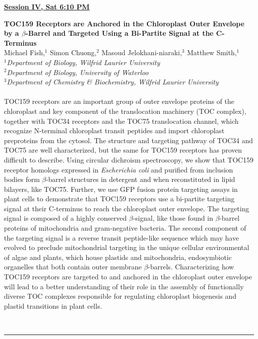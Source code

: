 \documentclass[titlepage,oneside,openany,10pt]{book}
\newenvironment{oralabs}[4] %
        {
        \begin{flushright}
                \underline{\textbf{#4}}
        \end{flushright}
        \textbf{#1}\\%
        #2\\%
        \textit{#3}\\\\%
        }
        {
        \\
        \noindent\rule{15cm}{0.5pt}%
        }
\begin{document}

\newpage

\begin{oralabs}
    {TOC159 Receptors are Anchored in the Chloroplast Outer Envelope by a $\beta$-Barrel and Targeted Using a Bi-Partite Signal at the C-Terminus}
    {Michael Fish,$^{1}$ Simon Chuong,$^{2}$ Masoud Jelokhani-niaraki,$^{3}$ Matthew Smith,$^{1}$}
    {
    $^1$Department of Biology, Wilfrid Laurier University\\
    $^2$Department of Biology, University of Waterloo\\
    $^3$Department of Chemistry \& Biochemistry, Wilfrid Laurier University
    }
    {Session IV, Sat 6:10 PM}
    TOC159 receptors are an important group of outer envelope proteins of the chloroplast and key component of the translocation machinery (TOC complex), together with TOC34 receptors and the TOC75 translocation channel, which recognize N-terminal chloroplast transit peptides and import chloroplast preproteins from the cytosol. The structure and targeting pathway of TOC34 and TOC75 are well characterized, but the same for TOC159 receptors has proven difficult to describe. Using circular dichroism spectroscopy, we show that TOC159 receptor homologs expressed in \emph{Escherichia coli} and purified from inclusion bodies form $\beta$-barrel structures in detergent and when reconstituted in lipid bilayers, like TOC75. Further, we use GFP fusion protein targeting assays in plant cells to demonstrate that TOC159 receptors use a bi-partite targeting signal at their C-terminus to reach the chloroplast outer envelope. The targeting signal is composed of a highly conserved $\beta$-signal, like those found in $\beta$-barrel proteins of mitochondria and gram-negative bacteria. The second component of the targeting signal is a reverse transit peptide-like sequence which may have evolved to preclude mitochondrial targeting in the unique cellular environmental of algae and plants, which house plastids and mitochondria, endosymbiotic organelles that both contain outer membrane $\beta$-barrels. Characterizing how TOC159 receptors are targeted to and anchored in the chloroplast outer envelope will lead to a better understanding of their role in the assembly of functionally diverse TOC complexes responsible for regulating chloroplast biogenesis and plastid transitions in plant cells.
    \label{FishM}
\end{oralabs}
\end{document}
